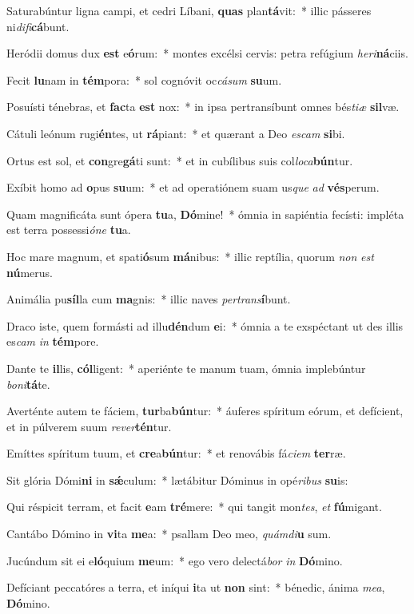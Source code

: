 \item Saturabúntur ligna campi, et cedri Líbani, \textbf{quas} plan\textbf{tá}vit:~* illic pásseres ni\textit{di}\textit{fi}\textbf{cá}bunt.
\item Heródii domus dux \textbf{est} e\textbf{ó}rum:~* montes excélsi cervis: petra refúgium \textit{he}\textit{ri}\textbf{ná}ciis.
\item Fecit \textbf{lu}nam in \textbf{tém}pora:~* sol cognóvit oc\textit{cá}\textit{sum} \textbf{su}um.
\item Posuísti ténebras, et \textbf{fac}ta \textbf{est} nox:~* in ipsa pertransíbunt omnes bés\textit{ti}\textit{æ} \textbf{sil}væ.
\item Cátuli leónum rugi\textbf{én}tes, ut \textbf{rá}piant:~* et quærant a Deo \textit{es}\textit{cam} \textbf{si}bi.
\item Ortus est sol, et \textbf{con}gre\textbf{gá}ti sunt:~* et in cubílibus suis col\textit{lo}\textit{ca}\textbf{bún}tur.
\item Exíbit homo ad \textbf{o}pus \textbf{su}um:~* et ad operatiónem suam us\textit{que} \textit{ad} \textbf{vés}perum.
\item Quam magnificáta sunt ópera \textbf{tu}a, \textbf{Dó}mine!~* ómnia in sapiéntia fecísti: impléta est terra possessi\textit{ó}\textit{ne} \textbf{tu}a.
\item Hoc mare magnum, et spati\textbf{ó}sum \textbf{má}nibus:~* illic reptília, quorum \textit{non} \textit{est} \textbf{nú}merus.
\item Animália pu\textbf{síl}la cum \textbf{ma}gnis:~* illic naves \textit{per}\textit{trans}\textbf{í}bunt.
\item Draco iste, quem formásti ad illu\textbf{dén}dum \textbf{e}i:~* ómnia a te exspéctant ut des illis es\textit{cam} \textit{in} \textbf{tém}pore.
\item Dante te \textbf{il}lis, \textbf{cól}ligent:~* aperiénte te manum tuam, ómnia implebúntur \textit{bo}\textit{ni}\textbf{tá}te.
\item Averténte autem te fáciem, \textbf{tur}ba\textbf{bún}tur:~* áuferes spíritum eórum, et defícient, et in púlverem suum \textit{re}\textit{ver}\textbf{tén}tur.
\item Emíttes spíritum tuum, et \textbf{cre}a\textbf{bún}tur:~* et renovábis fá\textit{ci}\textit{em} \textbf{ter}ræ.
\item Sit glória Dómi\textbf{ni} in \textbf{sǽ}culum:~* lætábitur Dóminus in opé\textit{ri}\textit{bus} \textbf{su}is:
\item Qui réspicit terram, et facit \textbf{e}am \textbf{tré}mere:~* qui tangit mon\textit{tes}, \textit{et} \textbf{fú}migant.
\item Cantábo Dómino in \textbf{vi}ta \textbf{me}a:~* psallam Deo meo, \textit{quám}\textit{di}\textbf{u} sum.
\item Jucúndum sit ei e\textbf{ló}quium \textbf{me}um:~* ego vero delectá\textit{bor} \textit{in} \textbf{Dó}mino.
\item Defíciant peccatóres a terra, et iníqui \textbf{i}ta ut \textbf{non} sint:~* bénedic, ánima \textit{me}\textit{a}, \textbf{Dó}mino.
